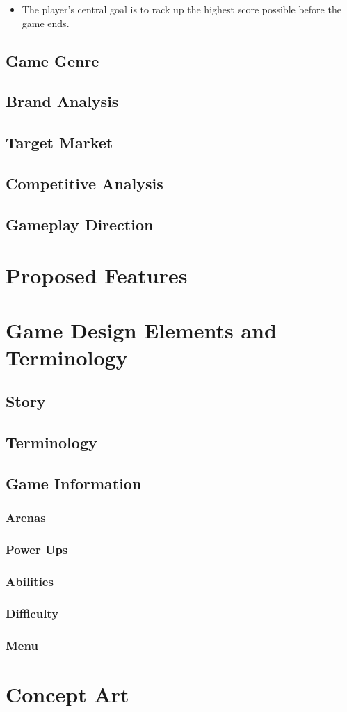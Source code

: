 \documentclass[12p]{article}
\theoremstyle{definition}
\begin{document}
\begin{itemize}
  \item The player's central goal is to rack up the highest score possible
    before the game ends.
\end{itemize}

\subsection{Game Genre}
\subsection{Brand Analysis}
\subsection{Target Market}
\subsection{Competitive Analysis}
\subsection{Gameplay Direction}
\section{Proposed Features}
\section{Game Design Elements and Terminology}
\subsection{Story}
\subsection{Terminology}
\subsection{Game Information}
\subsubsection{Arenas}
\subsubsection{Power Ups}
\subsubsection{Abilities}
\subsubsection{Difficulty}
\subsubsection{Menu}

\section{Concept Art}
\end{document}
